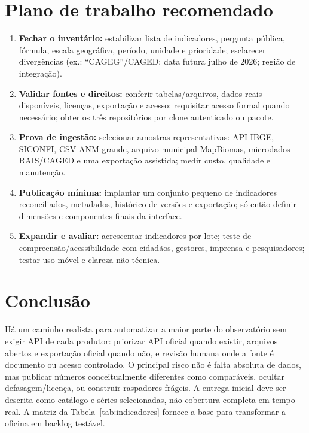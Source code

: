 \documentclass[12pt]{article}
\begin{document}
\section{Plano de trabalho recomendado}
\begin{enumerate}
  \item \textbf{Fechar o inventário:} estabilizar lista de indicadores, pergunta pública, fórmula, escala geográfica, período, unidade e prioridade; esclarecer divergências (ex.: ``CAGEG''/CAGED; data futura julho de 2026; região de integração).
  \item \textbf{Validar fontes e direitos:} conferir tabelas/arquivos, dados reais disponíveis, licenças, exportação e acesso; requisitar acesso formal quando necessário; obter os três repositórios por clone autenticado ou pacote.
  \item \textbf{Prova de ingestão:} selecionar amostras representativas: API IBGE, SICONFI, CSV ANM grande, arquivo municipal MapBiomas, microdados RAIS/CAGED e uma exportação assistida; medir custo, qualidade e manutenção.
  \item \textbf{Publicação mínima:} implantar um conjunto pequeno de indicadores reconciliados, metadados, histórico de versões e exportação; só então definir dimensões e componentes finais da interface.
  \item \textbf{Expandir e avaliar:} acrescentar indicadores por lote; teste de compreensão/acessibilidade com cidadãos, gestores, imprensa e pesquisadores; testar uso móvel e clareza não técnica.
\end{enumerate}

\section{Conclusão}
Há um caminho realista para automatizar a maior parte do observatório sem exigir API de cada produtor: priorizar API oficial quando existir, arquivos abertos e exportação oficial quando não, e revisão humana onde a fonte é documento ou acesso controlado. O principal risco não é falta absoluta de dados, mas publicar números conceitualmente diferentes como comparáveis, ocultar defasagem/licença, ou construir raspadores frágeis. A entrega inicial deve ser descrita como catálogo e séries selecionadas, não cobertura completa em tempo real. A matriz da Tabela~\ref{tab:indicadores} fornece a base para transformar a oficina em backlog testável.



\end{document}
